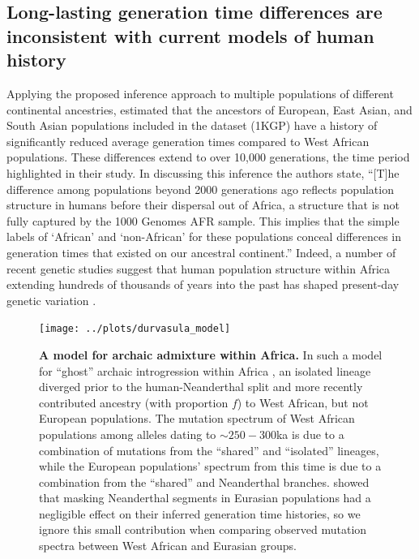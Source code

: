 \documentclass[]{article}
\begin{document}
\subsection*{Long-lasting generation time differences are inconsistent with
current models of human history}

Applying the proposed inference approach to multiple populations of different
continental ancestries, \citet{wang2023human} estimated that the ancestors of
European, East Asian, and South Asian populations included in the
\citet{1000genomes2015} dataset (1KGP) have a history of significantly reduced
average generation times compared to West African populations. These
differences extend to over 10,000 generations, the time period highlighted in
their study.
In discussing this inference the authors state, ``[T]he difference
among populations beyond 2000 generations ago reflects population structure in
humans before their dispersal out of Africa, a structure that is not fully
captured by the 1000 Genomes AFR sample. This implies that the simple labels of
`African' and `non-African' for these populations conceal differences in
generation times that existed on our ancestral continent.'' Indeed, a number of
recent genetic studies suggest that human population structure within Africa
extending hundreds of thousands of years into the past has shaped
present-day genetic variation
\citep{hammer2011genetic,hsieh2016model,hey2018phylogeny,
ragsdale2019models,lorente2019whole,durvasula2020recovering}.

\begin{figure}[t!]
    \centering
    \texttt{[image: ../plots/durvasula\_model]}
    \caption{
        \textbf{A model for archaic admixture within Africa.} In such a model
        for ``ghost'' archaic introgression within Africa
        \citep{durvasula2020recovering}, an isolated lineage diverged prior to
        the human-Neanderthal split and more recently contributed ancestry
        (with proportion $f$) to West African, but not European populations.
        The mutation spectrum of West African populations among alleles dating
        to $\sim250-300$ka is due to a combination of mutations from the
        ``shared'' and ``isolated'' lineages, while the European populations'
        spectrum from this time is due to a combination from the ``shared'' and
        Neanderthal branches.  \citet{wang2023human} showed that masking
        Neanderthal segments in Eurasian populations had a negligible effect on
        their inferred generation time histories, so we ignore this small
        contribution when comparing observed mutation spectra between West
        African and Eurasian groups.
    }
    \label{fig:durvasula-model}
\end{figure}
\end{document}
